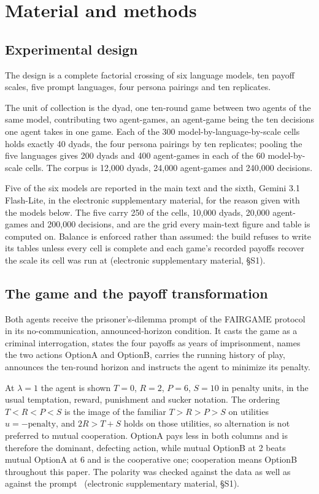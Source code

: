 \documentclass[11pt,a4paper]{article}
\newcommand{\lam}{\lambda}
\begin{document}
\section{Material and methods}
\label{sec:methods}

\subsection{Experimental design}

The design is a complete factorial crossing of six language models, ten payoff
scales, five prompt languages, four persona pairings and ten replicates.

The unit of collection is the dyad, one ten-round game between two agents of the
same model, contributing two agent-games, an agent-game being the ten decisions
one agent takes in one game. Each of the 300
model-by-language-by-scale cells holds exactly 40 dyads, the four persona
pairings by ten replicates; pooling the five languages gives 200 dyads and 400
agent-games in each of the 60 model-by-scale cells. The corpus is 12{,}000
dyads, 24{,}000 agent-games and 240{,}000 decisions.

Five of the six models are reported in the main text and the sixth, Gemini 3.1
Flash-Lite, in the electronic supplementary material, for the reason given with
the models below. The five carry 250 of the cells, 10{,}000 dyads, 20{,}000
agent-games and 200{,}000 decisions, and are the grid every main-text figure and
table is computed on. Balance is enforced rather than assumed: the build refuses
to write its tables unless every cell is complete and each game's recorded
payoffs recover the scale its cell was run at (electronic supplementary
material, \S S1).

\subsection{The game and the payoff transformation}

Both agents receive the prisoner's-dilemma prompt of the FAIRGAME
protocol~\citep{fairgame2025} in its no-communication, announced-horizon
condition. It casts the game as a criminal interrogation, states the four
payoffs as years of imprisonment, names the two actions OptionA and OptionB,
carries the running history of play, announces the ten-round horizon and
instructs the agent to minimize its penalty.

At $\lam = 1$ the agent is shown $T = 0$, $R = 2$, $P = 6$, $S = 10$ in penalty
units, in the usual temptation, reward, punishment and sucker notation. The
ordering $T < R < P < S$ is the image of the familiar $T > R > P > S$ on
utilities
$u = -\text{penalty}$, and $2R > T + S$ holds on those utilities, so alternation
is not preferred to mutual cooperation. OptionA pays less in both
columns and is therefore the dominant, defecting action, while mutual OptionB at
2 beats mutual OptionA at 6 and is the cooperative one; cooperation means
OptionB throughout this paper. The polarity was checked against the data as well
as against the prompt~\citep{selfpreprint2026scaling} (electronic supplementary
material, \S S1).
\end{document}
